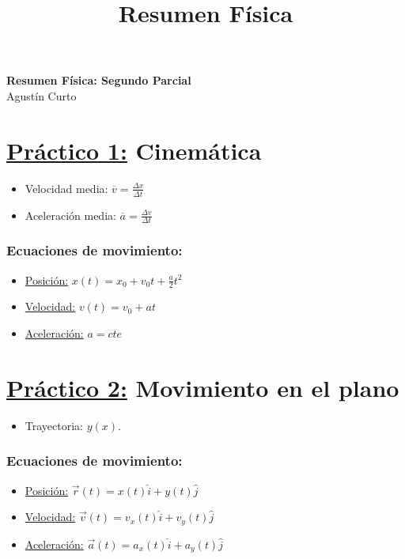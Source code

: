 \documentclass[12pt,a4paper]{article}
\title{Resumen Física}
\begin{document}
	\begin{center}
		\Huge \textbf{Resumen Física: Segundo Parcial} \\
		\large Agustín Curto
	\end{center}

	\section*{\underline{Práctico 1:} Cinemática}
		\begin{multicols}{2}
			\begin{itemize}
				\item Velocidad media: $\overline{v} = \frac{\Delta x}{\Delta t}$
				\item Aceleración media: $\overline{a} = \frac{\Delta v}{\Delta t}$
			\end{itemize}
		\end{multicols}

		\subsubsection*{Ecuaciones de movimiento:}
			\begin{multicols}{3}
				\begin{itemize}
					\item \underline{Posición:} $x(t) = x_{0} + v_{0} t + \frac{a}{2} t^{2}$
					\item \underline{Velocidad:} $v(t) = v_{0} + at$
					\item \underline{Aceleración:} $a = cte$
				\end{itemize}
			\end{multicols}

	\section*{\underline{Práctico 2:} Movimiento en el plano}
		\begin{itemize}
			\item Trayectoria: $y(x)$.
		\end{itemize}

		\subsubsection*{Ecuaciones de movimiento:}
			\begin{itemize}
				\item \underline{Posición:} $\vec{r}(t) = x(t) \hat{i} + y(t) \hat{j}$
				\item \underline{Velocidad:} $\vec{v}(t) = v_{x}(t) \hat{i} + v_{y}(t) \hat{j}$
				\item \underline{Aceleración:} $\vec{a}(t) = a_{x}(t) \hat{i} + a_{y}(t) \hat{j}$
			\end{itemize}
\end{document}
